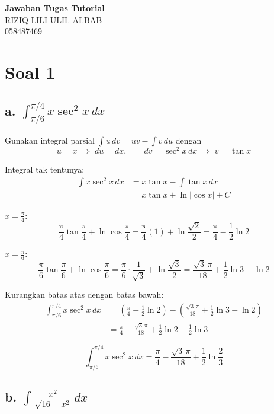 \documentclass[12pt]{article}
\begin{document}
\begin{center}
{\Large\textbf{Jawaban Tugas Tutorial}}\\[4pt]
RIZIQ LILI ULIL ALBAB \\
058487469
\end{center}

\section*{Soal 1}

\subsection*{a. $\displaystyle\int_{\pi/6}^{\pi/4} x\sec^2 x\,dx$}

Gunakan integral parsial $\displaystyle\int u\,dv = uv - \int v\,du$ dengan
\[
u = x \;\Rightarrow\; du = dx, \qquad dv = \sec^2 x\,dx \;\Rightarrow\; v = \tan x
\]

Integral tak tentunya:
\begin{align*}
\int x\sec^2 x\,dx &= x\tan x - \int \tan x\,dx \\
&= x\tan x + \ln|\cos x| + C
\end{align*}

$x = \frac{\pi}{4}$:
\[
\frac{\pi}{4}\tan\frac{\pi}{4} + \ln\cos\frac{\pi}{4}
= \frac{\pi}{4}(1) + \ln\frac{\sqrt2}{2}
= \frac{\pi}{4} - \frac12\ln 2
\]

$x = \frac{\pi}{6}$:
\[
\frac{\pi}{6}\tan\frac{\pi}{6} + \ln\cos\frac{\pi}{6}
= \frac{\pi}{6}\cdot\frac{1}{\sqrt3} + \ln\frac{\sqrt3}{2}
= \frac{\sqrt3\,\pi}{18} + \frac12\ln 3 - \ln 2
\]

Kurangkan batas atas dengan batas bawah:
\begin{align*}
\int_{\pi/6}^{\pi/4} x\sec^2 x\,dx
&= \left(\frac{\pi}{4} - \frac12\ln 2\right) - \left(\frac{\sqrt3\,\pi}{18} + \frac12\ln 3 - \ln 2\right) \\
&= \frac{\pi}{4} - \frac{\sqrt3\,\pi}{18} + \frac12\ln 2 - \frac12\ln 3
\end{align*}

\[
\int_{\pi/6}^{\pi/4} x\sec^2 x\,dx = \frac{\pi}{4} - \frac{\sqrt3\,\pi}{18} + \frac12\ln\frac23
\]

\subsection*{b. $\displaystyle\int \frac{x^2}{\sqrt{16-x^2}}\,dx$}
\end{document}
